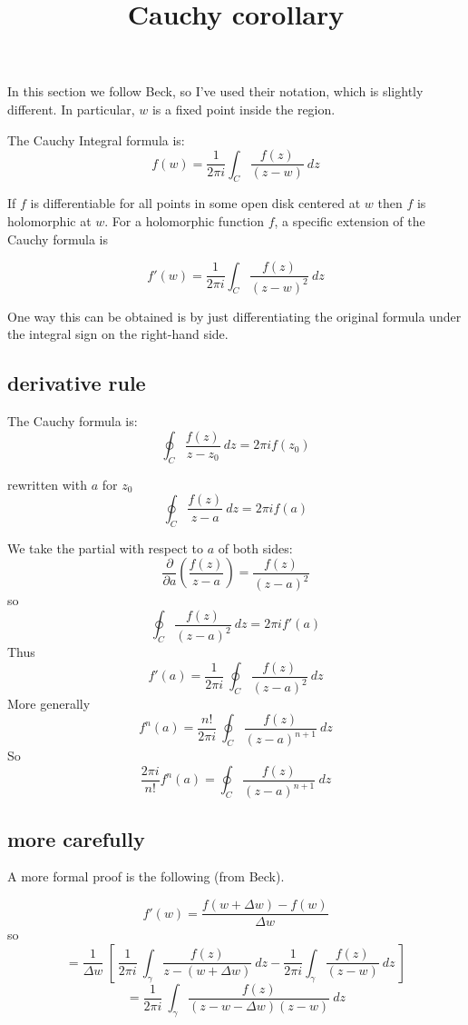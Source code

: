 \documentclass[11pt, oneside]{article}
\title{Cauchy corollary}
\date{}
\begin{document}
\maketitle
\Large


In this section we follow Beck, so I've used their notation, which is slightly different.  In particular, $w$ is a fixed point inside the region.

The Cauchy Integral formula is:
\[ f(w) = \frac{1}{2 \pi i} \int_C \frac{f(z)}{(z - w)} \ dz \]

If $f$ is differentiable for all points in some open disk centered at $w$ then $f$ is holomorphic at $w$.  For a holomorphic function $f$, a specific extension of the Cauchy formula is

\[ f'(w) = \frac{1}{2 \pi i} \int_C \frac{f(z)}{(z - w)^2} \ dz \]

One way this can be obtained is by just differentiating the original formula under the integral sign on the right-hand side. 

\subsection*{derivative rule}

The Cauchy formula is:
\[ \oint_C \frac{f(z)}{z-z_0} \ dz = 2 \pi i f(z_0) \]

rewritten with $a$ for $z_0$
\[ \oint_C \frac{f(z)}{z-a} \ dz = 2 \pi i f(a) \]

We take the partial with respect to $a$ of both sides:
\[ \frac{\partial}{\partial a} ( \frac{f(z)}{z-a} ) = \frac{f(z)}{(z-a)^2} \]
so
\[ \oint_C \frac{f(z)}{(z-a)^2} \ dz = 2 \pi i f'(a) \]
Thus
\[ f'(a) = \frac{1}{2 \pi i} \ \oint_C \frac{f(z)}{(z-a)^2} \ dz \]
More generally
\[ f^n(a) = \frac{n!}{2 \pi i} \ \oint_C \frac{f(z)}{(z-a)^{n+1}} \ dz \]
So
\[ \frac{2 \pi i}{n!} f^n(a) = \oint_C \frac{f(z)}{(z-a)^{n+1}} \ dz \]

\subsection*{more carefully} 

A more formal proof is the following (from Beck).

\[ f'(w) = \frac{f(w + \Delta w) - f(w)}{\Delta w} \]
so
\[ = \frac{1}{\Delta w} \ [ \ \frac{1}{2 \pi i} \ \int_{\gamma} \frac{f(z)}{z - (w + \Delta w)} \ dz - \frac{1}{2 \pi i} \int_{\gamma} \frac{f(z)}{(z - w)} \ dz \ ] \]
\[ =  \frac{1}{2 \pi i} \ \int_{\gamma} \frac{f(z)}{(z - w - \Delta w)(z-w)} \ dz  \]
\end{document}
